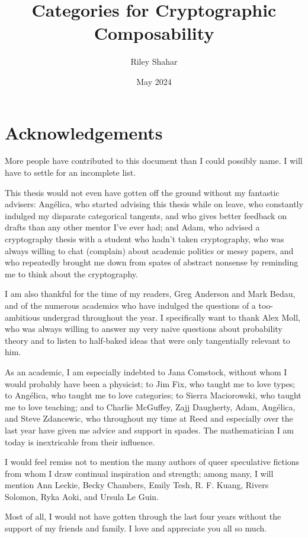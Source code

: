 \documentclass[12pt,twoside]{reedthesis}
\title{Categories for Cryptographic Composability}
\author{Riley Shahar}
\date{May 2024}
\begin{document}
\maketitle
\frontmatter
\pagestyle{empty}

\chapter*{Acknowledgements}

More people have contributed to this document than I could possibly name. I will
have to settle for an incomplete list.

This thesis would not even have gotten off the ground without my fantastic
advisers: Angélica, who started advising this thesis while on leave, who
constantly indulged my disparate categorical tangents, and who gives better
feedback on drafts than any other mentor I've ever had; and Adam, who advised a
cryptography thesis with a student who hadn't taken cryptography, who was always
willing to chat (complain) about academic politics or messy papers, and who
repeatedly brought me down from spates of abstract nonsense by reminding me to
think about the cryptography.

I am also thankful for the time of my readers, Greg Anderson and Mark Bedau, and
of the numerous academics who have indulged the questions of a too-ambitious
undergrad throughout the year. I specifically want to thank Alex Moll, who was
always willing to answer my very naive questions about probability theory and to
listen to half-baked ideas that were only tangentially relevant to him.

As an academic, I am especially indebted to Jana Comstock, without whom I would
probably have been a physicist; to Jim Fix, who taught me to love types; to
Angélica, who taught me to love categories; to Sierra Maciorowski, who taught me
to love teaching; and to Charlie McGuffey, Zajj Daugherty, Adam, Angélica, and
Steve Zdancewic, who throughout my time at Reed and especially over the last
year have given me advice and support in spades. The mathematician I am
today is inextricable from their influence.

I would feel remiss not to mention the many authors of queer speculative
fictions from whom I draw continual inspiration and strength; among many, I will
mention Ann Leckie, Becky Chambers, Emily Tesh, R. F. Kuang, Rivers Solomon,
Ryka Aoki, and Ursula Le Guin.

Most of all, I would not have gotten through the last four years without the
support of my friends and family. I love and appreciate you all so much.
\end{document}
